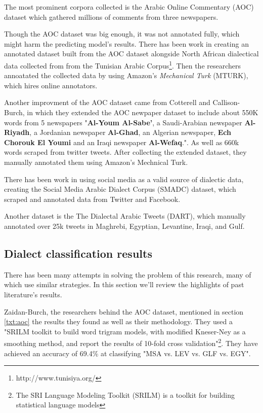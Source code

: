\documentclass[12pt]{diazessay}
\begin{document}
    
    The most prominent corpora collected is the Arabic Online Commentary (AOC) dataset which gathered millions of comments from three newspapers\cite{zaidan_burch}\label{txt:aoc}.
    
    Though the AOC dataset was big enough, it was not annotated fully, which might harm the predicting model's results. There has been work in creating an annotated dataset built from the AOC dataset alongside North African dialectical data collected from from the Tunisian Arabic Corpus\footnote{http://www.tunisiya.org/}. Then the researchers annoatated the collected data by using Amazon's \emph{Mechanical Turk} (MTURK), which hires online annotators\cite{el_haj_etal_2018_arabic}.
     
    Another improvment of the AOC dataset came from Cotterell and Callison-Burch, in which they extended the AOC newpaper dataset to include about 550K words from 5 newspapers "\textbf{Al-Youm Al-Sabe’}, a Saudi-Arabian newspaper \textbf{Al-Riyadh}, a Jordanian newspaper \textbf{Al-Ghad}, an Algerian newspaper, \textbf{Ech Chorouk El Youmi} and an Iraqi newspaper \textbf{Al-Wefaq}.". As well as 660k words scraped from twitter tweets. After collecting the extended dataset, they manually annotated them using Amazon's Mechnical Turk\cite{cotterell-callison-burch-2014-multi}.
     
    There has been work in using social media as a valid source of dialectic data, creating the Social Media Arabic Dialect Corpus (SMADC) dataset, which scraped and annotated data from Twitter and Facebook\cite{alshutayri_inproceedings}.
    
    Another dataset is the The Dialectal Arabic Tweets (DART), which manually annotated over 25k tweets in Maghrebi, Egyptian, Levantine, Iraqi, and Gulf\cite{alsarsour-etal-2018-dart}.
     
     
    \subsection{Dialect classification results}
        There has been many attempts in solving the problem of this research, many of which use similar strategies. In this section we'll review the highlights of past literature's results.
        
        Zaidan-Burch, the researchers behind the AOC dataset, mentioned in section \ref{txt:aoc} the results they found as well as their methodology. They used a "SRILM toolkit to build word trigram models, with modified Kneser-Ney as a smoothing method, and report the results of 10-fold cross validation"\footnote{The SRI Language Modeling Toolkit (SRILM) is a toolkit for building statistical language models}. They have achieved an accuracy of 69.4\% at classifying "MSA vs. LEV vs. GLF vs. EGY"\cite{zaidan_burch}.
        
\end{document}
